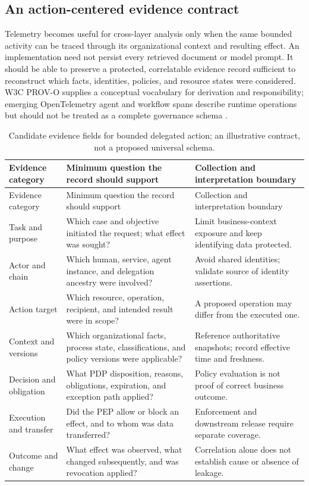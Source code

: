 \documentclass[11pt,letterpaper]{article}
\newcommand{\parencite}[1]{\citep{#1}}
\begin{document}
\subsection{An action-centered evidence contract}
Telemetry becomes useful for cross-layer analysis only when the same bounded activity can be traced through its organizational context and resulting effect. An implementation need not persist every retrieved document or model prompt. It should be able to preserve a protected, correlatable evidence record sufficient to reconstruct which facts, identities, policies, and resource states were considered. W3C PROV-O supplies a conceptual vocabulary for derivation and responsibility; emerging OpenTelemetry agent and workflow spans describe runtime operations but should not be treated as a complete governance schema \parencite{w3c2013prov,otel2026agent}.

\begin{longtable}{P{0.23\textwidth} P{0.38\textwidth} P{0.27\textwidth}}
\caption{Candidate evidence fields for bounded delegated action; an illustrative contract, not a proposed universal schema.}\label{tab:action-evidence}\\
\toprule
Evidence category & Minimum question the record should support & Collection and interpretation boundary \\
\midrule
\endfirsthead
\toprule
Evidence category & Minimum question the record should support & Collection and interpretation boundary \\
\midrule
\endhead
Task and purpose & Which case and objective initiated the request; what effect was sought? & Limit business-context exposure and keep identifying data protected. \\
Actor and chain & Which human, service, agent instance, and delegation ancestry were involved? & Avoid shared identities; validate source of identity assertions. \\
Action target & Which resource, operation, recipient, and intended result were in scope? & A proposed operation may differ from the executed one. \\
Context and versions & Which organizational facts, process state, classifications, and policy versions were applicable? & Reference authoritative snapshots; record effective time and freshness. \\
Decision and obligation & What PDP disposition, reasons, obligations, expiration, and exception path applied? & Policy evaluation is not proof of correct business outcome. \\
Execution and transfer & Did the PEP allow or block an effect, and to whom was data transferred? & Enforcement and downstream release require separate coverage. \\
Outcome and change & What effect was observed, what changed subsequently, and was revocation applied? & Correlation alone does not establish cause or absence of leakage. \\
\bottomrule
\end{longtable}
\end{document}

